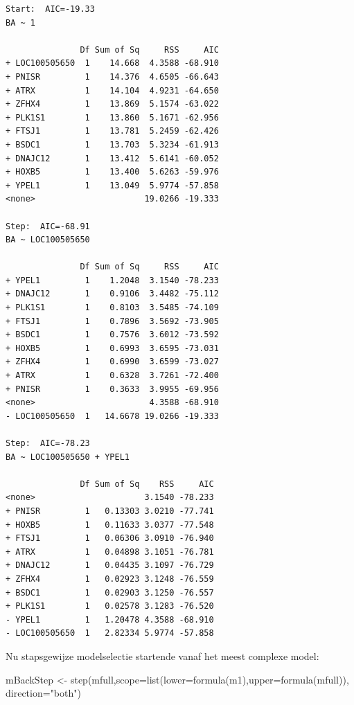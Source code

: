 \documentclass[
  dutch,
  letterpaper,
  12pt]{book}
\newenvironment{Shaded}{\begin{snugshade}}{\end{snugshade}}
\newcommand{\AttributeTok}[1]{\textcolor[rgb]{0.40,0.45,0.13}{#1}}
\newcommand{\FunctionTok}[1]{\textcolor[rgb]{0.28,0.35,0.67}{#1}}
\newcommand{\NormalTok}[1]{\textcolor[rgb]{0.00,0.23,0.31}{#1}}
\newcommand{\OtherTok}[1]{\textcolor[rgb]{0.00,0.23,0.31}{#1}}
\newcommand{\StringTok}[1]{\textcolor[rgb]{0.13,0.47,0.30}{#1}}
\newcounter{none} %
\theoremstyle{definition}
\theoremstyle{definition}
\theoremstyle{definition}
\theoremstyle{remark}
\begin{document}
\begin{verbatim}
Start:  AIC=-19.33
BA ~ 1

               Df Sum of Sq     RSS     AIC
+ LOC100505650  1    14.668  4.3588 -68.910
+ PNISR         1    14.376  4.6505 -66.643
+ ATRX          1    14.104  4.9231 -64.650
+ ZFHX4         1    13.869  5.1574 -63.022
+ PLK1S1        1    13.860  5.1671 -62.956
+ FTSJ1         1    13.781  5.2459 -62.426
+ BSDC1         1    13.703  5.3234 -61.913
+ DNAJC12       1    13.412  5.6141 -60.052
+ HOXB5         1    13.400  5.6263 -59.976
+ YPEL1         1    13.049  5.9774 -57.858
<none>                      19.0266 -19.333

Step:  AIC=-68.91
BA ~ LOC100505650

               Df Sum of Sq     RSS     AIC
+ YPEL1         1    1.2048  3.1540 -78.233
+ DNAJC12       1    0.9106  3.4482 -75.112
+ PLK1S1        1    0.8103  3.5485 -74.109
+ FTSJ1         1    0.7896  3.5692 -73.905
+ BSDC1         1    0.7576  3.6012 -73.592
+ HOXB5         1    0.6993  3.6595 -73.031
+ ZFHX4         1    0.6990  3.6599 -73.027
+ ATRX          1    0.6328  3.7261 -72.400
+ PNISR         1    0.3633  3.9955 -69.956
<none>                       4.3588 -68.910
- LOC100505650  1   14.6678 19.0266 -19.333

Step:  AIC=-78.23
BA ~ LOC100505650 + YPEL1

               Df Sum of Sq    RSS     AIC
<none>                      3.1540 -78.233
+ PNISR         1   0.13303 3.0210 -77.741
+ HOXB5         1   0.11633 3.0377 -77.548
+ FTSJ1         1   0.06306 3.0910 -76.940
+ ATRX          1   0.04898 3.1051 -76.781
+ DNAJC12       1   0.04435 3.1097 -76.729
+ ZFHX4         1   0.02923 3.1248 -76.559
+ BSDC1         1   0.02903 3.1250 -76.557
+ PLK1S1        1   0.02578 3.1283 -76.520
- YPEL1         1   1.20478 4.3588 -68.910
- LOC100505650  1   2.82334 5.9774 -57.858
\end{verbatim}

Nu stapsgewijze modelselectie startende vanaf het meest complexe model:

\begin{Shaded}
\begin{Highlighting}[]
\NormalTok{mBackStep }\OtherTok{\textless{}{-}} \FunctionTok{step}\NormalTok{(mfull,}\AttributeTok{scope=}\FunctionTok{list}\NormalTok{(}\AttributeTok{lower=}\FunctionTok{formula}\NormalTok{(m1),}\AttributeTok{upper=}\FunctionTok{formula}\NormalTok{(mfull)), }\AttributeTok{direction=}\StringTok{"both"}\NormalTok{)}
\end{Highlighting}
\end{Shaded}
\end{document}
